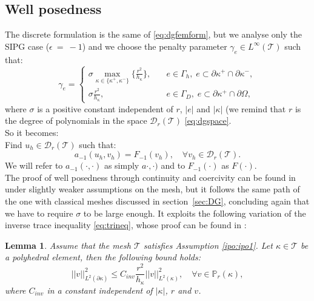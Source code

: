 \documentclass[12pt, a4paper]{article}
\theoremstyle{definition}
\theoremstyle{plain}
\newtheorem{lemma}{Lemma}
\theoremstyle{plain}
\begin{document}
\subsection{Well posedness}
The discrete formulation is the same of \eqref{eq:dgfemform}, but we analyse only the SIPG case ($\epsilon~=~-1$) and we choose the penalty parameter $\gamma_e \in L^\infty(\mathcal{T})$ such that:
\begin{equation} \label{eq:penalty}
	\gamma_e =
	\begin{cases}
		\sigma \max\limits_{\kappa \in \{\kappa^+, \kappa^-\}} \big\{ \frac{r^2}{h_\kappa}\big\},
		& \quad e \in \Gamma_h, \; e \subset \partial\kappa^+ \cap \partial\kappa^-,\\
		\sigma\frac{r^2}{h_\kappa},& \quad e \in \Gamma_D, \; e \subset \partial\kappa^+ \cap \partial\Omega,
	\end{cases}
\end{equation}
where $\sigma$ is a positive constant independent of $r$, $|e|$ and $|\kappa|$ (we remind that $r$ is the degree of polynomials in the space $\mathcal{D}_r(\mathcal{T})$ \eqref{eq:dgspace}.\\
So it becomes:\\
Find $u_h \in \mathcal{D}_r(\mathcal{T})$ such that:
\begin{equation} \label{eq:dgfempolyform}
	a_{-1}(u_h, v_h) = F_{-1}(v_h), \quad \forall v_h \in \mathcal{D}_r(\mathcal{T}).
\end{equation}
We will refer to $a_{-1}(\cdot, \cdot)$ as simply $a\cdot, \cdot)$ and to $F_{-1}(\cdot)$ as $F(\cdot)$.\\
The proof of well posedness through continuity and coercivity can be found in \cite{hpmet} under slightly weaker assumptions on the mesh, but it follows the same path of the one with classical meshes discussed in section~\ref{sec:DG}, concluding again that we have to require $\sigma$ to be large enough. It exploits the following variation of the inverse trace inequality \eqref{eq:trineq}, whose proof can be found in \cite{multigrid}:
\begin{lemma}
	Assume that the mesh $\mathcal{T}$ satisfies Assumption \ref{ipo:ipo1}. Let $\kappa \in \mathcal{T}$ be a polyhedral element, then the following bound holds:
	\begin{equation*}
		|\!|v|\!|^2_{L^2(\partial\kappa)} \leq C_{inv} \frac{r^2}{h_\kappa} |\!|v|\!|^2_{L^2(\kappa)}, \quad \forall v \in \mathbb{P}_r(\kappa),
	\end{equation*}
	where $C_{inv}$ in a constant independent of $|\kappa|$, $r$ and $v$.
\end{lemma}
\end{document}
